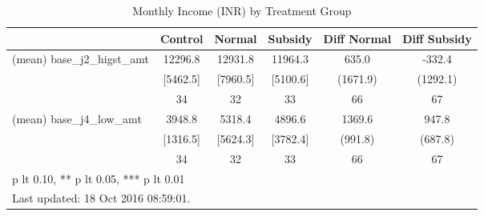 \begin{table}[htbp]\centering
\def\sym#1{\ifmmode^{#1}\else\(^{#1}\)\fi}
\caption{Monthly Income (INR) by Treatment Group \label{tab:"balance"}}
\begin{tabular*}{0.9\hsize}{@{\hskip\tabcolsep\extracolsep\fill}l*{1}{ccccc}}
\toprule
                                &  Control&   Normal&  Subsidy&Diff Normal         &Diff Subsidy         \\
\midrule
(mean) base\_j2\_higst\_amt        &  12296.8&  12931.8&  11964.3&    635.0         &   -332.4         \\
                                & [5462.5]& [7960.5]& [5100.6]& (1671.9)         & (1292.1)         \\
                                &       34&       32&       33&       66         &       67         \\
(mean) base\_j4\_low\_amt          &   3948.8&   5318.4&   4896.6&   1369.6         &    947.8         \\
                                & [1316.5]& [5624.3]& [3782.4]&  (991.8)         &  (687.8)         \\
                                &       34&       32&       33&       66         &       67         \\
\bottomrule
\multicolumn{6}{l}{\footnotesize * p lt 0.10, ** p lt 0.05, *** p lt 0.01}\\
\multicolumn{6}{l}{\footnotesize Last updated: 18 Oct 2016 08:59:01.}\\
\end{tabular*}
\end{table}
